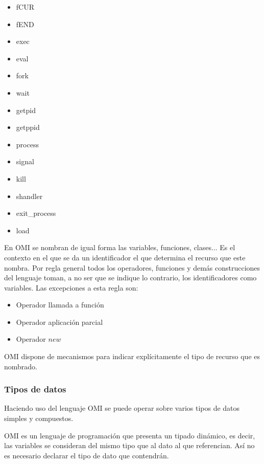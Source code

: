 \begin{multicols}{3}
\begin{itemize}
\item fCUR 
\item fEND 
\item exec 
\item eval 
\item fork 
\item wait 
\item getpid 
\item getppid 
\item process 
\item signal 
\item kill 
\item shandler 
\item exit\_process 
\item load 
\end{itemize}
\end{multicols}

En OMI se nombran de igual forma las variables, funciones, clases... Es el contexto 
en el que se da un identificador el que determina el recurso que este nombra. 
Por regla general todos los operadores, funciones y demás construcciones del lenguaje toman, 
a no ser que se indique lo contrario, los identificadores como variables. Las excepciones a esta regla son:

\begin {itemize}
   \item Operador llamada a función 
   \item Operador aplicación parcial
   \item Operador $new$
\end{itemize}

OMI dispone de mecanismos para indicar explícitamente el tipo de recurso que es nombrado.

\subsubsection{Tipos de datos}\label{sec:data_type}
Haciendo uso del lenguaje OMI se puede operar sobre varios tipos de datos simples y compuestos. 

OMI es un lenguaje de programación que presenta un tipado dinámico, es decir, las variables se consideran del mismo tipo que al dato al que 
referencian. Así no es necesario declarar el tipo de dato que contendrán.

